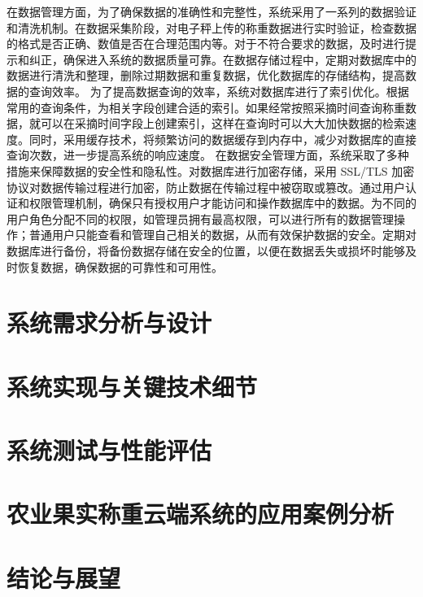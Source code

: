 \documentclass{xduugthesis}
\begin{document}
在数据管理方面，为了确保数据的准确性和完整性，系统采用了一系列的数据验证和清洗机制。在数据采集阶段，对电子秤上传的称重数据进行实时验证，检查数据的格式是否正确、数值是否在合理范围内等。对于不符合要求的数据，及时进行提示和纠正，确保进入系统的数据质量可靠。在数据存储过程中，定期对数据库中的数据进行清洗和整理，删除过期数据和重复数据，优化数据库的存储结构，提高数据的查询效率。
为了提高数据查询的效率，系统对数据库进行了索引优化。根据常用的查询条件，为相关字段创建合适的索引。如果经常按照采摘时间查询称重数据，就可以在采摘时间字段上创建索引，这样在查询时可以大大加快数据的检索速度。同时，采用缓存技术，将频繁访问的数据缓存到内存中，减少对数据库的直接查询次数，进一步提高系统的响应速度。
在数据安全管理方面，系统采取了多种措施来保障数据的安全性和隐私性。对数据库进行加密存储，采用 SSL/TLS 加密协议对数据传输过程进行加密，防止数据在传输过程中被窃取或篡改。通过用户认证和权限管理机制，确保只有授权用户才能访问和操作数据库中的数据。为不同的用户角色分配不同的权限，如管理员拥有最高权限，可以进行所有的数据管理操作；普通用户只能查看和管理自己相关的数据，从而有效保护数据的安全。定期对数据库进行备份，将备份数据存储在安全的位置，以便在数据丢失或损坏时能够及时恢复数据，确保数据的可靠性和可用性。





\chapter{系统需求分析与设计}



\chapter{系统实现与关键技术细节}



\chapter{系统测试与性能评估}



\chapter{农业果实称重云端系统的应用案例分析}



\chapter{结论与展望}
\end{document}
